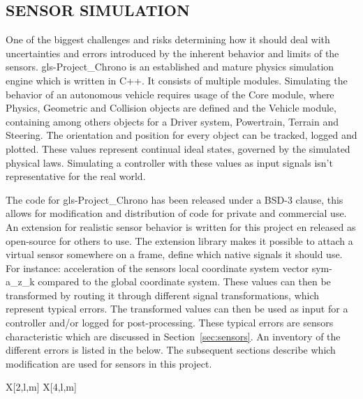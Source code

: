 \subsection{SENSOR SIMULATION}\label{sec:sensor simulation}

One of the biggest challenges and risks determining how it should deal with uncertainties and errors introduced by the
inherent behavior and limits of the sensors. \gls{gls-Project_Chrono} is an established and mature physics simulation
engine which
is written in C++. It consists of multiple modules. Simulating the behavior of an autonomous vehicle requires usage of
the Core module, where Physics, Geometric and Collision objects are defined and the Vehicle module, containing among
others objects for a Driver system, Powertrain, Terrain and Steering. The orientation and position for every object can
be tracked, logged and plotted. These values represent continual ideal states, governed by the simulated physical laws.
Simulating a controller with these values as input signals isn't representative for the real world.

The code for \gls{gls-Project_Chrono} has been released under a BSD-3 clause, this allows for modification and
distribution of
code for private and commercial use. An extension for realistic sensor behavior is written for this project en released
as open-source for others to use. The extension library makes it possible to attach a virtual sensor somewhere on a
frame, define which native signals it should use. For instance: acceleration of the sensors local coordinate system
vector \gls{sym-a_z_k} compared to the global coordinate system. These values can then be transformed by routing it
through different signal transformations, which represent typical errors. The transformed values can then be used as
input for a controller and/or logged for post-processing. These typical errors are sensors characteristic which are
discussed in Section~\ref{sec:sensors}. An inventory of the different errors is listed in the below. The subsequent
sections describe which modification are used for sensors in this project.

\begin{RoyalTable}{X[2,l,m] X[4,l,m]}
\end{RoyalTable}

